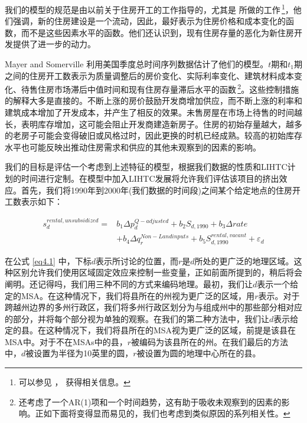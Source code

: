 \documentclass[lang=cn,11pt,a4paper]{paper}
\begin{document}
我们的模型的规范是由以前关于住房开工的工作指导的，尤其是 \cite{Mayer200085} 所做的工作\,\footnote{可以参见 \cite{Topel1988718}，\cite{DiPasquale1992337} 获得相关信息。}，他们强调，新的住房建设是一个流动，因此，最好表示为住房价格和成本变化的函数，而不是这些因素水平的函数。他们还认识到，现有住房存量的恶化为新住房开发提供了进一步的动力。

Mayer and Somerville 利用美国季度总时间序列数据估计了他们的模型。$t$期和$t_1$期之间的住房开工数表示为质量调整后的房价变化、实际利率变化、建筑材料成本变化、待售住房市场滞后中值时间和现有住房存量滞后水平的函数\,\footnote{\cite{Mayer200085} 还考虑了一个AR(1)项和一个时间趋势，这有助于吸收未观察到的因素的影响。正如下面将变得显而易见的，我们也考虑到类似原因的系列相关性。}。这些控制措施的解释大多是直接的。不断上涨的房价鼓励开发商增加供应，而不断上涨的利率和建筑成本增加了开发成本，并产生了相反的效果。未售房屋在市场上待售的时间越长，表明库存增加，这可能会阻止开发商建造新房子。住房的初始存量越大，越多的老房子可能会变得破旧或风格过时，因此更换的时机已经成熟。较高的初始库存水平也可能反映出推动住房需求和供应的其他未观察到的因素的影响。

我们的目标是评估一个考虑到上述特征的模型，根据我们数据的性质和LIHTC计划的时间进行定制。在模型中加入LIHTC发展将允许我们评估该项目的挤出效应。首先，我们将1990年到2000年(我们数据的时间段)之间某个给定地点的住房开工数表示如下：

\begin{equation}\label{eq4.1}
  \begin{aligned}
  s_{d}^{rental,unsubsidized}=& b_{1} \Delta p_{d}^{Q-adjusted}+b_{2} S_{d, 1990}+b_{3} \Delta r a t e \\
  &+b_{4} \Delta q_{r}^{Non-Landinputs}+b_{5} S_{d, 1990}^{rental, vacant}+\varepsilon_{d}
  \end{aligned}
\end{equation}
\vspace{3pt}

在公式 \eqref{eq4.1} 中，下标$d$表示所讨论的位置，而$r$是$d$所处的更广泛的地理区域。这种区别允许我们使用区域固定效应来控制一些变量，正如前面所提到的，稍后将会阐明。还记得吗，我们用三种不同的方式来编码地理。最初，我们让$d$表示一个给定的MSA。在这种情况下，我们将县所在的州视为更广泛的区域，用$r$表示。对于跨越州边界的多州行政区，我们将多州行政区划分为与组成州中的那些部分相对应的部分，并将每个部分视为单独的观察。在我们的第二种方法中，我们让$d$表示给定的县。在这种情况下，我们将县所在的MSA视为更广泛的区域，前提是该县在MSA中。对于不在MSAs中的县，$r$被编码为该县所在的州。在我们最后的方法中，$d$被设置为半径为10英里的圆，$r$被设置为圆的地理中心所在的县。
\end{document}
